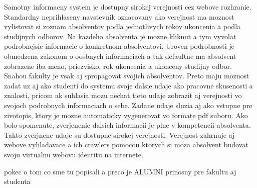 \documentclass{iitsrc}[2006/14/02]
\begin{document}
Samotny informacny system je dostupny sirokej verejnosti cez webove rozhranie. Standardny neprihlaseny navstevnik oznacovany ako verejnost ma moznost vylistovat si zoznam absolventov podla jednotlivych rokov ukoncenia a podla studijnych odborov. Na kazdeho absolventa je mozne kliknut a tym vyvolat podrobnejsie informacie o konkretnom absolventovi.  Uroven podrobnosti je obmedzena zakonom o oosbnych informaciach a tak defaultne ma absolvent zobrazene iba meno, priezvisko, rok ukoncenia a ukonceny studijny odbor. Snahou fakulty je vsak aj spropagovat svojich absolventov. Preto maju moznost zadat uz aj ako studenti do systemu svoje dalsie udaje ako pracovne skusenosti a znalosti, pricom ak suhlasia mozu nechat tieto udaje zobrazit aj verejnosti vo svojoch podrobnych informaciach o sebe. Zadane udaje sluzia aj ako vstupne pre zivotopis, ktory je mozne automaticky vygenerovat vo formate pdf suboru. Ako bolo spomenute, zverjenenie dalsich informacii je plne v kompetencii absolventa. Takto zverjnene udaje su dostupne sirokej verejnosti. Verejnost zahrnuje aj webove vyhladavace a ich crawlers pomocou ktorych si moza absolvent budovat svoju virtualnu webovu identitu na internete.

pokec o tom co sme tu popisali a preco je ALUMNI prinosny pre fakultu aj studenta 
  

\nocite{pcispec}
\nocite{ac97spec}
\nocite{ich4spec}
\nocite{crytalspec}
\nocite{osdesign}
\nocite{wdmdriver}
\nocite{alsadriver}
\nocite{pciwiki}



\end{document}
